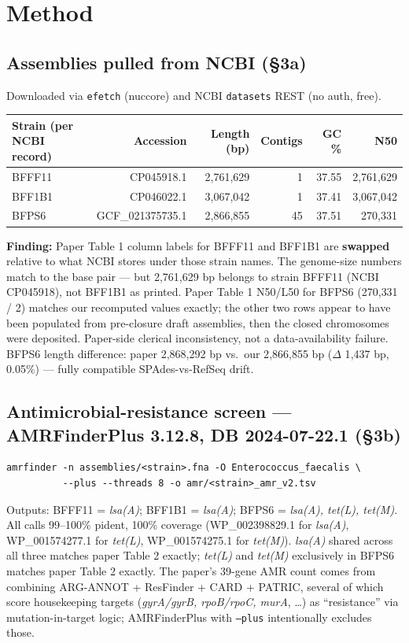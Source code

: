 \documentclass[11pt]{article}
\begin{document}
\section{Method}
\subsection{Assemblies pulled from NCBI (\S3a)}
Downloaded via \texttt{efetch} (nuccore) and NCBI \texttt{datasets} REST (no auth, free).
\begin{center}
\begin{tabular}{lrrrrr}
\toprule
Strain (per NCBI record) & Accession & Length (bp) & Contigs & GC \% & N50 \\
\midrule
BFFF11 & CP045918.1 & 2{,}761{,}629 & 1 & 37.55 & 2{,}761{,}629 \\
BFF1B1 & CP046022.1 & 3{,}067{,}042 & 1 & 37.41 & 3{,}067{,}042 \\
BFPS6  & GCF\_021375735.1 & 2{,}866{,}855 & 45 & 37.51 & 270{,}331 \\
\bottomrule
\end{tabular}
\end{center}

\textbf{Finding:} Paper Table 1 column labels for BFFF11 and BFF1B1 are \textbf{swapped} relative to what NCBI stores under those strain names. The genome-size numbers match to the base pair --- but 2{,}761{,}629 bp belongs to strain BFFF11 (NCBI CP045918), not BFF1B1 as printed. Paper Table 1 N50/L50 for BFPS6 (270{,}331 / 2) matches our recomputed values exactly; the other two rows appear to have been populated from pre-closure draft assemblies, then the closed chromosomes were deposited. Paper-side clerical inconsistency, not a data-availability failure. BFPS6 length difference: paper 2{,}868{,}292 bp vs.\ our 2{,}866{,}855 bp ($\Delta$ 1{,}437 bp, 0.05\%) --- fully compatible SPAdes-vs-RefSeq drift.

\subsection{Antimicrobial-resistance screen --- AMRFinderPlus 3.12.8, DB 2024-07-22.1 (\S3b)}
\begin{lstlisting}
amrfinder -n assemblies/<strain>.fna -O Enterococcus_faecalis \
          --plus --threads 8 -o amr/<strain>_amr_v2.tsv
\end{lstlisting}
Outputs: BFFF11 = \emph{lsa(A)}; BFF1B1 = \emph{lsa(A)}; BFPS6 = \emph{lsa(A), tet(L), tet(M)}. All calls 99--100\% pident, 100\% coverage (WP\_002398829.1 for \emph{lsa(A)}, WP\_001574277.1 for \emph{tet(L)}, WP\_001574275.1 for \emph{tet(M)}). \emph{lsa(A)} shared across all three matches paper Table 2 exactly; \emph{tet(L)} and \emph{tet(M)} exclusively in BFPS6 matches paper Table 2 exactly. The paper's 39-gene AMR count comes from combining ARG-ANNOT + ResFinder + CARD + PATRIC, several of which score housekeeping targets (\emph{gyrA/gyrB, rpoB/rpoC, murA}, \ldots) as ``resistance'' via mutation-in-target logic; AMRFinderPlus with \texttt{--plus} intentionally excludes those.
\end{document}
